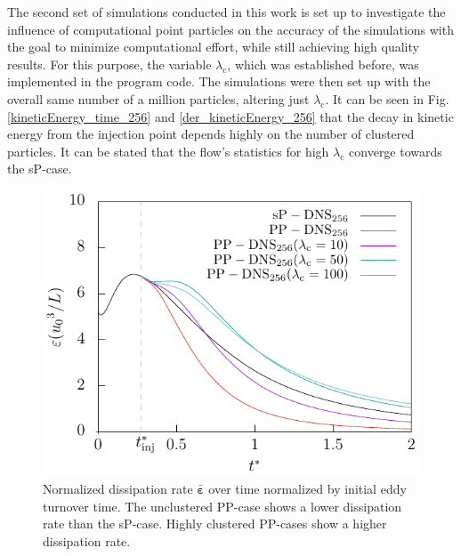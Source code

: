 \documentclass[11pt,a4paper,openany,oneside,parskip=half*]{article}
\renewcommand*\vec[1]{\boldsymbol{#1}}
\begin{document}
\newline
The second set of simulations conducted in this work is set up to investigate the influence of computational point particles on the accuracy of the simulations with the goal to minimize computational effort, while still achieving high quality results. For this purpose, the variable $\lambda_\mathrm{c}$, which was established before, was implemented in the program code. The simulations were then set up with the overall same number of a million particles, altering just $\lambda_\mathrm{c}$. It can be seen in Fig. \ref{kineticEnergy_time_256} and \ref{der_kineticEnergy_256} that the decay in kinetic energy from the injection point depends highly on the number of clustered particles. It can be stated that the flow's statistics for high $\lambda_\mathrm{c}$ converge towards the sP-case. 
\begin{figure}[h]
    \centering
    \begin{minipage}[t]{0.5\textwidth}
         \centering
        \includegraphics[width=\linewidth]{./Abbildungen/256/diss_time.pdf}
        \caption{Normalized dissipation rate $\bar{\vec{\varepsilon}}$ over time normalized by initial eddy turnover time. The unclustered PP-case shows a lower dissipation rate than the sP-case. Highly clustered PP-cases show a higher dissipation rate.}
        \label{diss_time_256}
    \end{minipage}%
    \begin{minipage}[t]{0.5\textwidth}
        \centering

\end{minipage}
\end{figure}
\end{document}
